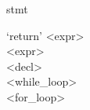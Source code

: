 \documentclass[convert={outext=.png}]{standalone}
\begin{document}
\begin{málrit}{stmt}
	\begin{stack}
		`return' <expr>\\
		<expr>\\
		<decl>\\
		<while_loop>\\
		<for_loop>
	\end{stack}
\end{málrit}
\end{document}
